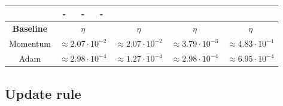 \begin{table*}
\begin{footnotesize}
\begin{tabular}{c|ccc|ccc|ccc|ccc}
                                                                                                                                                                                                     & - & - & -
      \\
      \midrule
      \textbf{Baseline}
                                          & \multicolumn{3}{c}{$\eta$}
                                                                                       & \multicolumn{3}{c}{$\eta$}
                                                                                                                                   & \multicolumn{3}{c}{$\eta$}
                                                                                                                                                                                & \multicolumn{3}{c}{$\eta$}
      \\
      \midrule
      Momentum
                                          & \multicolumn{3}{c}{$\approx 2.07 \cdot 10^{-2}$}
                                                                                       & \multicolumn{3}{c}{$\approx 2.07 \cdot 10^{-2}$}
                                                                                                                                   & \multicolumn{3}{c}{$\approx 3.79 \cdot 10^{-3}$}
                                                                                                                                                                                & \multicolumn{3}{c}{$\approx 4.83 \cdot 10^{-1}$}
      \\
      Adam
                                          & \multicolumn{3}{c}{$\approx 2.98 \cdot 10^{-4}$}
                                                                                       & \multicolumn{3}{c}{$\approx 1.27 \cdot 10^{-4}$}
                                                                                                                                   & \multicolumn{3}{c}{$\approx 2.98 \cdot 10^{-4}$}
                                                                                                                                                                                & \multicolumn{3}{c}{$\approx 6.95 \cdot 10^{-4}$}
      \\
      \bottomrule
    \end{tabular}
  \end{footnotesize}
\end{table*}

\subsection{Update rule}\label{backpack::app:update_rule_details}


